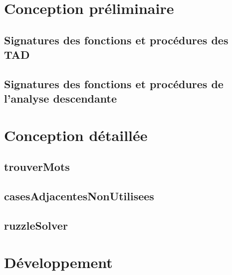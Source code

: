 \documentclass[a4paper]{report}
\begin{document}
	\chapter{Conception préliminaire}
		\section{Signatures des fonctions et procédures des TAD}
			
			
			
			

		\section{Signatures des fonctions et procédures de l'analyse descendante}
			


	\chapter{Conception détaillée}
		\section{trouverMots}
		
		\section{casesAdjacentesNonUtilisees}
		
		\section{ruzzleSolver}
		


	\chapter{Développement}
	
\end{document}
